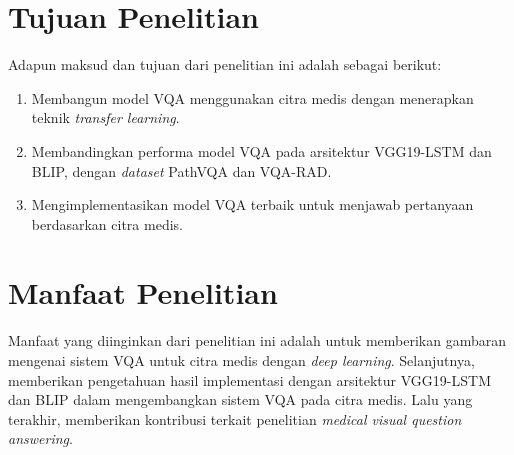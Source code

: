 \section{Tujuan Penelitian}
Adapun maksud dan tujuan dari penelitian ini adalah sebagai berikut:

\begin{enumerate}
	
	\item{Membangun model VQA menggunakan citra medis dengan menerapkan teknik \textit{transfer learning}.}

	\item{Membandingkan performa model VQA pada arsitektur VGG19-LSTM dan BLIP, dengan \textit{dataset} PathVQA dan VQA-RAD.}

	\item{Mengimplementasikan model VQA terbaik untuk menjawab pertanyaan berdasarkan citra medis.}

\end{enumerate}

\section{Manfaat Penelitian}
\par Manfaat yang diinginkan dari penelitian ini adalah untuk memberikan gambaran mengenai sistem VQA untuk citra medis dengan \textit{deep learning}. Selanjutnya, memberikan pengetahuan hasil implementasi dengan arsitektur VGG19-LSTM dan BLIP dalam mengembangkan sistem VQA pada citra medis. Lalu yang terakhir, memberikan kontribusi terkait penelitian \textit{medical visual question answering}. 





\begin{comment}

\end{comment}